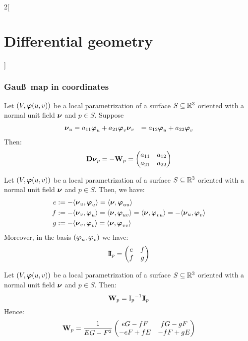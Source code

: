 \documentclass[../../../main.tex]{subfiles}
\begin{document}
\begin{multicols}{2}[\section{Differential geometry}]
  \subsubsection{Gau\ss\ map in coordinates}
  \begin{proposition}
    Let $(V,\boldsymbol{\mathrm{\varphi}}(u,v))$ be a local pa\-ram\-e\-triza\-tion of a surface $S\subseteq\mathbb{R}^3$ oriented with a normal unit field $\boldsymbol{\mathrm{\nu}}$ and $p\in S$.
    Suppose
    \begin{align*}
      \boldsymbol{\mathrm{\nu}}_u & =a_{11}\boldsymbol{\mathrm{\varphi}}_u+a_{21}\boldsymbol{\mathrm{\varphi}}_v
      \boldsymbol{\mathrm{\nu}}_v & =a_{12}\boldsymbol{\mathrm{\varphi}}_u+a_{22}\boldsymbol{\mathrm{\varphi}}_v
    \end{align*}
    Then: $$\boldsymbol{\mathrm{D\nu}}_p=-\boldsymbol{\mathrm{W}}_p=\begin{pmatrix}
        a_{11} & a_{12} \\
        a_{21} & a_{22}
      \end{pmatrix}$$
  \end{proposition}
  \begin{proposition}
    Let $(V,\boldsymbol{\mathrm{\varphi}}(u,v))$ be a local pa\-ram\-e\-triza\-tion of a surface $S\subseteq\mathbb{R}^3$ oriented with a normal unit field $\boldsymbol{\mathrm{\nu}}$ and $p\in S$. Then, we have:
    \begin{align*}
      e & :=-\langle\boldsymbol{\mathrm{\nu}}_u,\boldsymbol{\mathrm{\varphi}}_u\rangle=\langle \boldsymbol{\mathrm{\nu}},\boldsymbol{\mathrm{\varphi}}_{uu}\rangle                                                                            \\
      f & :=-\langle\boldsymbol{\mathrm{\nu}}_v,\boldsymbol{\mathrm{\varphi}}_u\rangle=\langle \boldsymbol{\mathrm{\nu}},\boldsymbol{\mathrm{\varphi}}_{uv}\rangle=\langle \boldsymbol{\mathrm{\nu}},\boldsymbol{\mathrm{\varphi}}_{vu}\rangle=-\langle\boldsymbol{\mathrm{\nu}}_u,\boldsymbol{\mathrm{\varphi}}_v\rangle \\
      g & :=-\langle\boldsymbol{\mathrm{\nu}}_v,\boldsymbol{\mathrm{\varphi}}_v\rangle=\langle \boldsymbol{\mathrm{\nu}},\boldsymbol{\mathrm{\varphi}}_{vv}\rangle
    \end{align*}
    Moreover, in the basis $(\boldsymbol{\mathrm{\varphi}}_u,\boldsymbol{\mathrm{\varphi}}_v)$ we have:
    $$
      \mathrm{I\!I}_p=\begin{pmatrix}
        e & f \\
        f & g
      \end{pmatrix}
    $$
  \end{proposition}
  \begin{proposition}
    Let $(V,\boldsymbol{\mathrm{\varphi}}(u,v))$ be a local pa\-ram\-e\-triza\-tion of a surface $S\subseteq\mathbb{R}^3$ oriented with a normal unit field $\boldsymbol{\mathrm{\nu}}$ and $p\in S$. Then:
    $$\boldsymbol{\mathrm{W}}_p={\mathrm{I}_p}^{-1}\mathrm{I\!I}_p$$
    Hence: $$\boldsymbol{\mathrm{W}}_p=\frac{1}{EG-F^2}
      \begin{pmatrix}
        eG-fF  & fG-gF  \\
        -eF+fE & -fF+gE
      \end{pmatrix}$$

\end{proposition}
\end{multicols}
\end{document}
